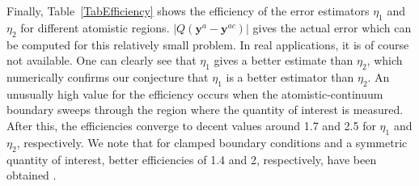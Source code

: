 \documentclass[11pt,reqno,oneside]{amsart}
\numberwithin{equation}{section}
\begin{document}
Finally, Table~\ref{TabEfficiency} shows the efficiency of the error estimators
$\eta_1$ and $\eta_2$ for different atomistic regions. $|Q({\mathbf{y}}^a-{\mathbf{y}}^{ac})|$ gives the actual error which can be computed for this relatively small
problem.  In real applications, it is of course not available.  One can clearly
see that $\eta_1$ gives a better estimate than $\eta_2$, which numerically
confirms our conjecture that $\eta_1$ is a better estimator than $\eta_2$.  An
unusually high value for the efficiency occurs when the atomistic-continuum
boundary sweeps through the region where the quantity of interest is measured.
After this, the efficiencies converge to decent values around 1.7 and 2.5 for
$\eta_1$ and $\eta_2$, respectively. We note that for clamped boundary
conditions and a symmetric quantity of interest, better efficiencies of 1.4 and
2, respectively, have been obtained \cite{ArndtLuskin:2007a}.

     



\end{document}
